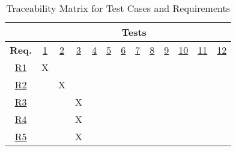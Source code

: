 \documentclass[12pt, titlepage]{article}
\begin{document}
\begin{table}[H]
    \centering
    \caption{Traceability Matrix for Test Cases and Requirements}
    \begin{tabular}{|c|cccccccccccc|}
\hline
 & \multicolumn{12}{c|}{\textbf{Tests}} \\
\hline
\textbf{Req.} & \multicolumn{1}{c|}{\hyperref[test-1]{1}} & \multicolumn{1}{c|}{\hyperref[test-2]{2}} & \multicolumn{1}{c|}{\hyperref[test-3]{3}}
& \multicolumn{1}{c|}{\hyperref[test-4]{4}} & \multicolumn{1}{c|}{\hyperref[test-5]{5}} & \multicolumn{1}{c|}{\hyperref[test-6]{6}}
& \multicolumn{1}{c|}{\hyperref[test-7]{7}} & \multicolumn{1}{c|}{\hyperref[test-8]{8}} & \multicolumn{1}{c|}{\hyperref[test-9]{9}}
& \multicolumn{1}{c|}{\hyperref[test-10]{10}} & \multicolumn{1}{c|}{\hyperref[test-11]{11}} & \hyperref[test-12]{12} \\ \hline

\hyperref[R1]{R1} & \multicolumn{1}{c|}{X}  & \multicolumn{1}{c|}{}  & \multicolumn{1}{c|}{}
& \multicolumn{1}{c|}{}  & \multicolumn{1}{c|}{}  & \multicolumn{1}{c|}{}
& \multicolumn{1}{c|}{}  & \multicolumn{1}{c|}{}  & \multicolumn{1}{c|}{}
& \multicolumn{1}{c|}{}   & \multicolumn{1}{c|}{}   &    \\ \hline

\hyperref[R2]{R2} & \multicolumn{1}{c|}{}  & \multicolumn{1}{c|}{X}  & \multicolumn{1}{c|}{}
& \multicolumn{1}{c|}{}  & \multicolumn{1}{c|}{}  & \multicolumn{1}{c|}{}
& \multicolumn{1}{c|}{}  & \multicolumn{1}{c|}{}  & \multicolumn{1}{c|}{}
& \multicolumn{1}{c|}{}   & \multicolumn{1}{c|}{}   &    \\ \hline

\hyperref[R3]{R3} & \multicolumn{1}{c|}{}  & \multicolumn{1}{c|}{}  & \multicolumn{1}{c|}{X}
& \multicolumn{1}{c|}{}  & \multicolumn{1}{c|}{}  & \multicolumn{1}{c|}{}
& \multicolumn{1}{c|}{}  & \multicolumn{1}{c|}{}  & \multicolumn{1}{c|}{}
& \multicolumn{1}{c|}{}   & \multicolumn{1}{c|}{}   &    \\ \hline

\hyperref[R4]{R4} & \multicolumn{1}{c|}{}  & \multicolumn{1}{c|}{}  & \multicolumn{1}{c|}{X}
& \multicolumn{1}{c|}{}  & \multicolumn{1}{c|}{}  & \multicolumn{1}{c|}{}
& \multicolumn{1}{c|}{}  & \multicolumn{1}{c|}{}  & \multicolumn{1}{c|}{}
& \multicolumn{1}{c|}{}   & \multicolumn{1}{c|}{}   &    \\ \hline

\hyperref[R5]{R5} & \multicolumn{1}{c|}{}  & \multicolumn{1}{c|}{}  & \multicolumn{1}{c|}{X}
& \multicolumn{1}{c|}{}  & \multicolumn{1}{c|}{}  & \multicolumn{1}{c|}{}
& \multicolumn{1}{c|}{}  & \multicolumn{1}{c|}{}  & \multicolumn{1}{c|}{}
& \multicolumn{1}{c|}{}   & \multicolumn{1}{c|}{}   &    \\ \hline


\end{tabular}
\end{table}
\end{document}
